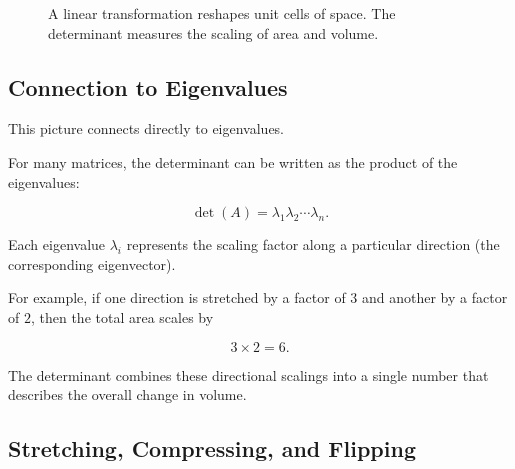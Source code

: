 \documentclass[11pt,openany]{book}
\theoremstyle{definition}
\begin{document}
\begin{figure}[htbp]
\begin{minipage}{0.45\textwidth}

\caption*{In $\mathbb{R}^3$, the determinant measures how the volume of the unit cube changes under the transformation.}
\end{minipage}

\caption{A linear transformation reshapes unit cells of space. The determinant measures the scaling of area and volume.}
\label{fig:determinant_geometry}

\end{figure}

\medskip

\subsection{Connection to Eigenvalues}

This picture connects directly to eigenvalues.

\medskip

For many matrices, the determinant can be written as the product of the eigenvalues:

\[
\det(A) = \lambda_1 \lambda_2 \cdots \lambda_n.
\]

\medskip

Each eigenvalue $\lambda_i$ represents the scaling factor along a particular direction
(the corresponding eigenvector).

\medskip

For example, if one direction is stretched by a factor of $3$ and another by a factor of $2$,
then the total area scales by

\[
3 \times 2 = 6.
\]

\medskip

The determinant combines these directional scalings into a single number that describes
the overall change in volume.

\medskip

\subsection{Stretching, Compressing, and Flipping}
\end{document}
